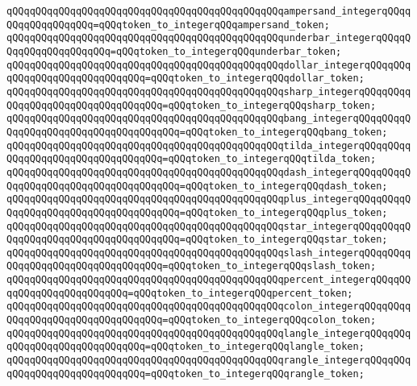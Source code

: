 \newline
\verb|qQQqqQQqqQQqqQQqqQQqqQQqqQQqqQQqqQQqqQQqqQQqqQQqampersand_integerqQQqqQQqqQQqqQQqqQQq=qQQqtoken_to_integerqQQqampersand_token;|\newline
\verb|qQQqqQQqqQQqqQQqqQQqqQQqqQQqqQQqqQQqqQQqqQQqqQQqunderbar_integerqQQqqQQqqQQqqQQqqQQqqQQq=qQQqtoken_to_integerqQQqunderbar_token;|\newline
\verb|qQQqqQQqqQQqqQQqqQQqqQQqqQQqqQQqqQQqqQQqqQQqqQQqdollar_integerqQQqqQQqqQQqqQQqqQQqqQQqqQQqqQQq=qQQqtoken_to_integerqQQqdollar_token;|\newline
\verb|qQQqqQQqqQQqqQQqqQQqqQQqqQQqqQQqqQQqqQQqqQQqqQQqsharp_integerqQQqqQQqqQQqqQQqqQQqqQQqqQQqqQQqqQQq=qQQqtoken_to_integerqQQqsharp_token;|\newline
\verb|qQQqqQQqqQQqqQQqqQQqqQQqqQQqqQQqqQQqqQQqqQQqqQQqbang_integerqQQqqQQqqQQqqQQqqQQqqQQqqQQqqQQqqQQqqQQq=qQQqtoken_to_integerqQQqbang_token;|\newline
\verb|qQQqqQQqqQQqqQQqqQQqqQQqqQQqqQQqqQQqqQQqqQQqqQQqtilda_integerqQQqqQQqqQQqqQQqqQQqqQQqqQQqqQQqqQQq=qQQqtoken_to_integerqQQqtilda_token;|\newline
\verb|qQQqqQQqqQQqqQQqqQQqqQQqqQQqqQQqqQQqqQQqqQQqqQQqdash_integerqQQqqQQqqQQqqQQqqQQqqQQqqQQqqQQqqQQqqQQq=qQQqtoken_to_integerqQQqdash_token;|\newline
\verb|qQQqqQQqqQQqqQQqqQQqqQQqqQQqqQQqqQQqqQQqqQQqqQQqplus_integerqQQqqQQqqQQqqQQqqQQqqQQqqQQqqQQqqQQqqQQq=qQQqtoken_to_integerqQQqplus_token;|\newline
\verb|qQQqqQQqqQQqqQQqqQQqqQQqqQQqqQQqqQQqqQQqqQQqqQQqstar_integerqQQqqQQqqQQqqQQqqQQqqQQqqQQqqQQqqQQqqQQq=qQQqtoken_to_integerqQQqstar_token;|\newline
\verb|qQQqqQQqqQQqqQQqqQQqqQQqqQQqqQQqqQQqqQQqqQQqqQQqslash_integerqQQqqQQqqQQqqQQqqQQqqQQqqQQqqQQqqQQq=qQQqtoken_to_integerqQQqslash_token;|\newline
\verb|qQQqqQQqqQQqqQQqqQQqqQQqqQQqqQQqqQQqqQQqqQQqqQQqpercent_integerqQQqqQQqqQQqqQQqqQQqqQQqqQQq=qQQqtoken_to_integerqQQqpercent_token;|\newline
\verb|qQQqqQQqqQQqqQQqqQQqqQQqqQQqqQQqqQQqqQQqqQQqqQQqcolon_integerqQQqqQQqqQQqqQQqqQQqqQQqqQQqqQQqqQQq=qQQqtoken_to_integerqQQqcolon_token;|\newline
\verb|qQQqqQQqqQQqqQQqqQQqqQQqqQQqqQQqqQQqqQQqqQQqqQQqlangle_integerqQQqqQQqqQQqqQQqqQQqqQQqqQQqqQQq=qQQqtoken_to_integerqQQqlangle_token;|\newline
\verb|qQQqqQQqqQQqqQQqqQQqqQQqqQQqqQQqqQQqqQQqqQQqqQQqrangle_integerqQQqqQQqqQQqqQQqqQQqqQQqqQQqqQQq=qQQqtoken_to_integerqQQqrangle_token;|\newline
